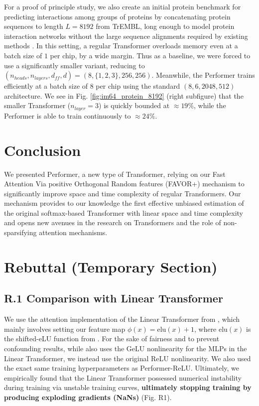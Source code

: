 For a proof of principle study, we also create an initial protein benchmark for predicting interactions among groups of proteins by concatenating protein sequences to length $L = 8192$ from TrEMBL, long enough to model protein interaction networks without the large sequence alignments required by existing methods \citep{cong2019protein}. In this setting, a regular Transformer overloads memory even at a batch size of $1$ per chip, by a wide margin. Thus as a baseline, we were forced to use a significantly smaller variant, reducing to $(n_{heads}, n_{layers}, d_{ff}, d) = (8, \{1,2,3\}, 256, 256)$. Meanwhile, the Performer trains efficiently at a batch size of 8 per chip using the standard $(8, 6, 2048, 512)$ architecture. We see in Fig. \ref{fig:im64_protein_8192} (right subfigure) that the smaller Transformer ($n_{layer} = 3$) is quickly bounded at $\approx 19\%$, while the Performer is able to train continuously to $\approx 24\%$.

\section{Conclusion}
\label{sec:conclusion}
We presented $\mathrm{Performer}$, a new type of Transformer, relying on our Fast Attention Via positive Orthogonal Random features (FAVOR+) mechanism to significantly improve space and time complexity of regular Transformers. Our mechanism provides to our knowledge the first effective unbiased estimation of the original softmax-based Transformer with linear space and time complexity and opens new avenues in the research on Transformers and the role of non-sparsifying attention mechanisms.

\section*{Rebuttal (Temporary Section)}

\subsection*{R.1 Comparison with Linear Transformer} We use the attention implementation of the Linear Transformer from \citep{trans-rnns}, which mainly involves setting our feature map $\phi(x) = \text{elu}(x) + 1$, where $\text{elu}(x)$ is the shifted-eLU function from \citep{elu}. For the sake of fairness and to prevent confounding results, while \citep{trans-rnns} also uses the GeLU nonlinearity for the MLPs in the Linear Transformer, we instead use the original ReLU nonlinearity. We also used the exact same training hyperparameters as Performer-ReLU. Ultimately, we empirically found that the Linear Transformer possessed numerical instability during training via unstable training curves, \textbf{ultimately stopping training by producing exploding gradients (NaNs)} (Fig. R1).

